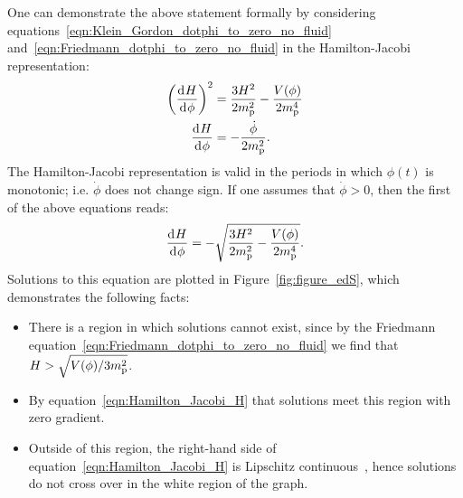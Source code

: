 One can demonstrate the above statement formally by considering equations~\eqref{eqn:Klein_Gordon_dotphi_to_zero_no_fluid} and~\eqref{eqn:Friedmann_dotphi_to_zero_no_fluid} in the Hamilton-Jacobi representation:
%
\begin{align}
  {\left(\frac{\operatorname{d}^{}\!{H}}{\operatorname{d}^{}\!{\phi}}\right)}^2
  &=
  \frac{3H^2}{2m_{\mathrm{p}}^2} - \frac{V(\phi)}{2m_{\mathrm{p}}^4}
  \\
  \frac{\operatorname{d}^{}\!{H}}{\operatorname{d}^{}\!{\phi}}
  &=
  -\frac{\dot{\phi}}{2m_{\mathrm{p}}^2}.
\end{align}
%
The Hamilton-Jacobi representation is valid in the periods in which \(\phi(t)\) is monotonic; i.e. \(\dot{\phi}\) does not change sign. If one assumes that \(\dot{\phi}>0\), then the first of the above equations reads:
%
\begin{equation}
  \frac{\operatorname{d}^{}\!{H}}{\operatorname{d}^{}\!{\phi}} 
  = 
  -\sqrt{\frac{3H^2}{2m_{\mathrm{p}}^2} - \frac{V(\phi)}{2m_{\mathrm{p}}^4}}.
  \label{eqn:Hamilton_Jacobi_H}
\end{equation}
%
Solutions to this equation are plotted in Figure~\ref{fig:figure_edS}, which demonstrates the following facts: 
%
\begin{itemize}
  \item There is a region in which solutions cannot exist, since by the Friedmann equation~\eqref{eqn:Friedmann_dotphi_to_zero_no_fluid} we find that \(H>\sqrt{V(\phi)/3m_{\mathrm{p}}^2}\).
  \item  By equation~\eqref{eqn:Hamilton_Jacobi_H} that solutions meet this region with zero gradient.
  \item Outside of this region, the right-hand side of equation~\eqref{eqn:Hamilton_Jacobi_H} is Lipschitz continuous~\citep[see Section~\ref{sec:uniqueness_theorem}, or][]{agarwal_1993}, hence solutions do not cross over in the white region of the graph.
\end{itemize}
% 

